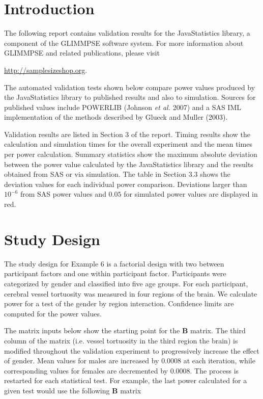 \documentclass{glimmpse-report}
\begin{document}
\section{Introduction}
The following report contains validation results for the JavaStatistics library, a component of the GLIMMPSE software system.  For more information about GLIMMPSE and related publications, please visit

 

\href{http://samplesizeshop.org}{http://samplesizeshop.org}.

The automated validation tests shown below compare power values produced by the JavaStatistics library to published results and also to simulation.  Sources for published values include POWERLIB (Johnson \emph{et al.} 2007) and a SAS IML implementation of the methods described by Glueck and Muller (2003).

Validation results are listed in Section 3 of the report.  Timing results show the calculation and simulation times for the overall experiment and the mean times per power calculation.  Summary statistics show the maximum absolute deviation between the power value calculated by the JavaStatistics library and the results obtained from SAS or via simulation.  The table in Section 3.3 shows the deviation values for each individual power comparison.  Deviations larger than $10^{-6}$ from SAS power values and $0.05$ for simulated power values are displayed in red.

 \section{Study Design}
The study design for Example 6 is a factorial design with two between participant factors and one within participant factor.  Participants were categorized by gender and classified into five age groups.  For each participant, cerebral vessel tortuosity was measured in four regions of the brain.  We calculate power for a test of the gender by region interaction. Confidence limits are computed for the power values.

The matrix inputs below show the starting point for the $\mathbf{B}$ matrix. The third column of the matrix (i.e. vessel tortuosity in the third region the brain) is modified throughout the validation experiment to progressively increase the effect of gender.  Mean values for males are increased by 0.0008 at each iteration, while corresponding values for females are decremented by 0.0008.  The process is restarted for each statistical test.  For example, the last power calculated for a given test would use the following $\mathbf{B}$ matrix
\end{document}
